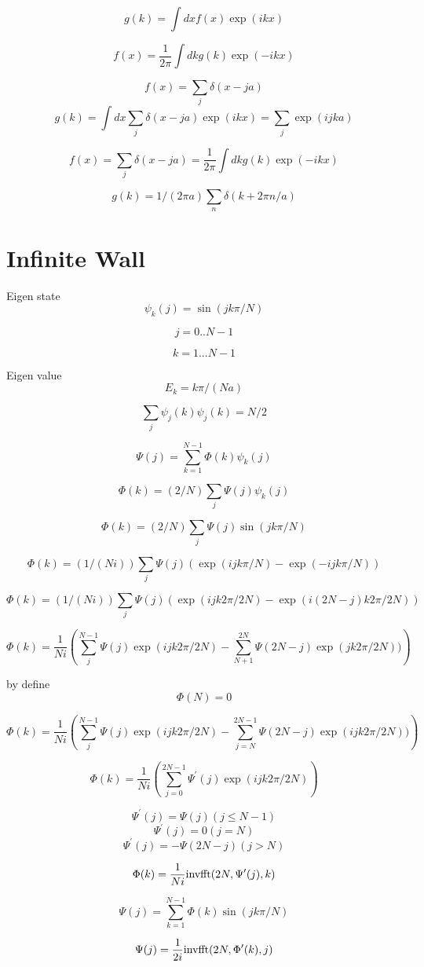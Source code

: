 $$
g(k) = \int dx f(x) \exp(ikx)
$$

$$
f(x) = \frac{1}{2\pi}\int dk g(k) \exp(-ikx)
$$

$$
f(x) = \sum_j \delta(x - ja)
$$
$$
g(k) = \int dx \sum_j \delta(x - ja) \exp(ikx) = \sum_j \exp(ijka)
$$

$$
f(x) = \sum_j \delta(x - ja) = \frac{1}{2\pi}\int dk g(k) \exp(-ikx)
$$

$$
g(k) = 1/(2\pi a)\sum_n \delta(k+2\pi n/a)
$$


\section{Infinite Wall}

Eigen state
$$
\psi_k(j) = \sin(jk\pi/N)
$$

$$
j=0..N-1
$$

$$
k=1...N-1
$$

Eigen value
$$
E_k = k\pi/(N a)
$$

$$
\sum_j \psi_j(k)\psi_j(k) = N/2
$$

$$
\Psi(j) = \sum_{k=1}^{N-1} \Phi(k) \psi_k(j)
$$

$$
\Phi(k) = (2/N) \sum_j \Psi(j) \psi_k(j)
$$

$$
\Phi(k) = (2/N) \sum_j \Psi(j) \sin(jk\pi/N)
$$

$$
\Phi(k) = (1/(Ni)) \sum_j \Psi(j) (\exp(ijk\pi/N) - \exp(-ijk\pi/N))
$$

$$
\Phi(k) = (1/(Ni)) \sum_j \Psi(j) (\exp(ijk2\pi/2N) - \exp(i(2N-j)k2\pi/2N))
$$

$$
\Phi(k) = \frac{1}{Ni}\left(\sum_j^{N-1} \Psi(j)\exp(ijk2\pi/2N) - \sum_{N+1}^{2N} \Psi(2N-j)\exp(jk2\pi/2N))\right)
$$

by define
$$
\Phi(N)=0
$$

$$
\Phi(k) = \frac{1}{Ni}\left(\sum_j^{N-1} \Psi(j)\exp(ijk2\pi/2N) - \sum_{j=N}^{2N-1} \Psi(2N-j)\exp(ijk2\pi/2N))\right)
$$

$$
\Phi(k) = \frac{1}{Ni}\left(\sum_{j=0}^{2N-1} \Psi^\prime(j)\exp(ijk2\pi/2N)\right)
$$

$$
\Psi^\prime(j) = \Psi(j) (j \le N-1)
$$
$$
\Psi^\prime(j) = 0 (j = N)
$$
$$
\Psi^\prime(j) = -\Psi(2N-j) (j > N)
$$

$$
\Phi(k) = \frac{1}{Ni} {\rm inv fft}(2N, \Psi^\prime(j), k)
$$


$$
\Psi(j) = \sum_{k=1}^{N-1} \Phi(k) \sin(jk\pi/N)
$$

$$
\Psi(j) = \frac{1}{2i} {\rm inv fft}(2N, \Phi^\prime(k), j)
$$

